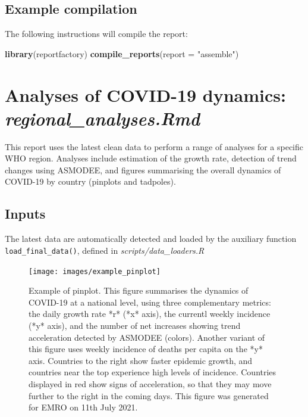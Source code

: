 \documentclass[]{book}
\newenvironment{Shaded}{\begin{snugshade}}{\end{snugshade}}
\newcommand{\DataTypeTok}[1]{\textcolor[rgb]{0.13,0.29,0.53}{#1}}
\newcommand{\KeywordTok}[1]{\textcolor[rgb]{0.13,0.29,0.53}{\textbf{#1}}}
\newcommand{\NormalTok}[1]{#1}
\newcommand{\StringTok}[1]{\textcolor[rgb]{0.31,0.60,0.02}{#1}}
\begin{document}
\hypertarget{example-compilation}{%
\subsection{Example compilation}\label{example-compilation}}

The following instructions will compile the report:

\begin{Shaded}
\begin{Highlighting}[]
\KeywordTok{library}\NormalTok{(reportfactory)}
\KeywordTok{compile_reports}\NormalTok{(}\DataTypeTok{report =} \StringTok{"assemble"}\NormalTok{)}
\end{Highlighting}
\end{Shaded}

\hypertarget{analyses-of-covid-19-dynamics-regional_analyses.rmd}{%
\section{\texorpdfstring{Analyses of COVID-19 dynamics: \emph{regional\_analyses.Rmd}}{Analyses of COVID-19 dynamics: regional\_analyses.Rmd}}\label{analyses-of-covid-19-dynamics-regional_analyses.rmd}}

This report uses the latest clean data to perform a range of analyses for a
specific WHO region. Analyses include estimation of the growth rate, detection
of trend changes using ASMODEE, and figures summarising the overall dynamics of
COVID-19 by country (pinplots and tadpoles).

\hypertarget{inputs-1}{%
\subsection{Inputs}\label{inputs-1}}

The latest data are automatically detected and loaded by the auxiliary function
\texttt{load\_final\_data()}, defined in \emph{scripts/data\_loaders.R}

\begin{figure}

{\centering \texttt{[image: images/example\_pinplot]} 

}

\caption{Example of pinplot. This figure summarises the dynamics of COVID-19 at a national level, using three complementary metrics: the daily growth rate *r* (*x* axis), the currentl weekly incidence (*y* axis), and the number of net increases showing trend acceleration detected by ASMODEE (colors). Another variant of this figure uses weekly incidence of deaths per capita on the *y* axis. Countries to the right show faster epidemic growth, and countries near the top experience high levels of incidence. Countries displayed in red show signs of acceleration, so that they may move further to the right in the coming days. This figure was generated for EMRO on 11th July 2021.}\label{fig:pinplot}
\end{figure}
\end{document}
